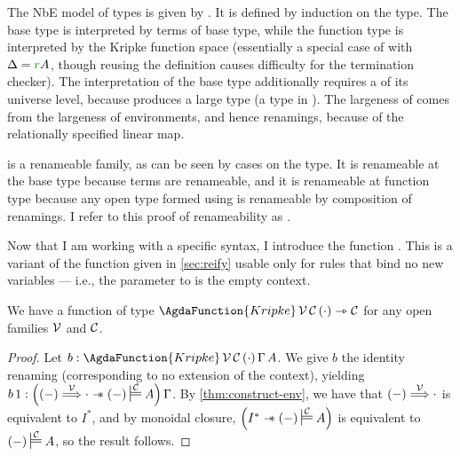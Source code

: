 
The NbE model of types is given by \AgdaFunction{\_$\vDash$\_}.
It is defined by induction on the type.
The base type is interpreted by terms of base type, while
the function type is interpreted by the Kripke function space (essentially a
special case of  with $\Delta = \gr rA$, though reusing
the  definition causes difficulty for the termination
checker).
The interpretation of the base type additionally requires a 
of its universe level, because  produces a large type
(a type in ).
The largeness of  comes from the largeness of
environments, and hence renamings, because of the relationally specified linear
map.


\AgdaFunction{\_$\vDash$\_} is a renameable family, as can be seen by cases on
the type.
It is renameable at the base type because terms are renameable, and it is
renameable at function type because any open type formed using
 is renameable by composition of renamings.
I refer to this proof of renameability as
.

Now that I am working with a specific syntax, I introduce the function
.
This is a variant of the  function given in \cref{sec:reify}
usable only for rules that bind no new variables --- i.e., the parameter
\AgdaBound{$\Delta$} to  is the empty context.

\begin{lemma}
  We have a function of type
  $\AgdaFunction{Kripke}\,\V\,\C\,\plr{\cdot} \rightarrowtriangle \C$ for any
  open families $\mathcal V$ and $\mathcal C$.
\end{lemma}
\begin{proof}
  Let $b : \AgdaFunction{Kripke}\,\V\,\C\,\plr{\cdot}\,\Gamma\,A$.
  We give $b$ the identity renaming (corresponding to no extension of the
  context), yielding
  $b\,1 : \plr{\plr{-} \env\V {\cdot} \wand \plr{-} \sdtstile{}\C A}\,\Gamma$.
  By \cref{thm:construct-env}, we have that $\plr{-} \env\V {\cdot}$ is
  equivalent to $I^*$, and by monoidal closure,
  $\plr{I^* \wand \plr{-} \sdtstile{}\C A}$ is equivalent to
  $\plr{-} \sdtstile{}\C A$, so the result follows.
\end{proof}

